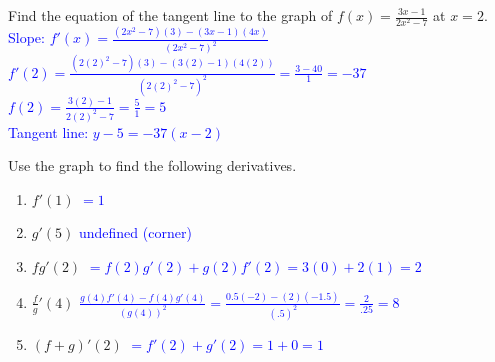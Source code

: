\documentclass{ximera}
\begin{document}
\begin{exercise}
    Find the equation of the tangent line to the graph of $f(x)=\frac{3x-1}{2x^2-7}$ at $x=2$.\\
    \textcolor{blue}{Slope: $f'(x)=\frac{(2x^2-7)(3)-(3x-1)(4x)}{(2x^2-7)^2}$\\
    $f'(2)=\frac{(2(2)^2-7)(3)-(3(2)-1)(4(2))}{(2(2)^2-7)^2}=\frac{3-40}{1}=-37$\\
    $f(2)=\frac{3(2)-1}{2(2)^2-7}=\frac{5}{1}=5$\\
    Tangent line: $y-5=-37(x-2)$}
\end{exercise}




\begin{exercise}
    Use the graph to find the following derivatives.
    \begin{image}
\end{image}
    \begin{enumerate}
        \item $f'(1)$ \textcolor{blue}{$=1$}
       \item $g'(5)$ \textcolor{blue}{undefined (corner)}
        \item $fg'(2)$ \textcolor{blue}{$=f(2)g'(2)+g(2)f'(2)=3(0)+2(1)=2$}
        \item $\frac{f}{g}'(4)$ \textcolor{blue}{$\frac{g(4)f'(4)-f(4)g'(4)}{(g(4))^2}=\frac{0.5(-2)-(2)(-1.5)}{(.5)^2}=\frac{2}{.25}=8$}
        \item $(f+g)'(2)$ \textcolor{blue}{$=f'(2)+g'(2)=1+0=1$}
    \end{enumerate}
\end{exercise}
\end{document}
